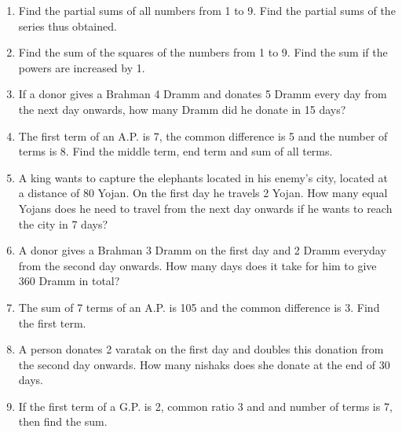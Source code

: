 \begin{enumerate}[label=\thechapter.\arabic*,ref=\thechapter.\theenumi]
\item Find the partial sums of all numbers from 1 to 9.  Find the partial sums of the series thus obtained.
\item Find the sum of the squares of the numbers from 1 to 9.  Find the sum if the powers are increased by 1.
\item If a donor gives a Brahman 4 Dramm and donates 5 Dramm every day from the next day onwards,  how many Dramm did he donate in 15 days?
\item The first term of an A.P. is 7, the common difference is 5 and the number of terms is 8.  Find the middle term, end term and sum of all terms.

\item A king wants to capture the elephants located in his enemy's city, located at a distance of 80 Yojan. On the first day he travels 2 Yojan.  How many equal Yojans does he need to
	travel from the next day onwards if he wants to reach the city in 7 days?
\item A donor gives a Brahman 3 Dramm  on the first day and 2 Dramm everyday from the second day onwards.  How many days does it take for him to give 360 Dramm in total?
\item The sum of 7 terms of an A.P. is 105 and the common difference is 3.  Find the first term.  
\item A person donates 2 varatak on the first day and doubles this donation from the second day onwards. How many nishaks does she donate  at the end of 30 days.
\item If the first term of a G.P. is 2, common ratio 3 and and number of terms is 7, then find the sum.

\end{enumerate}
